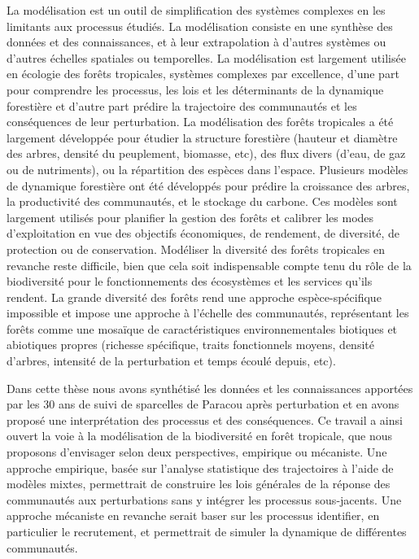 \documentclass[
  11pt,
  french,
  A4paper,
  extrafontsizes,onecolumn,openright
  ]{memoir}
\begin{document}
La modélisation est un outil de simplification des systèmes complexes en
les limitants aux processus étudiés. La modélisation consiste en une
synthèse des données et des connaissances, et à leur extrapolation à
d'autres systèmes ou d'autres échelles spatiales ou temporelles. La
modélisation est largement utilisée en écologie des forêts tropicales,
systèmes complexes par excellence, d'une part pour comprendre les
processus, les lois et les déterminants de la dynamique forestière et
d'autre part prédire la trajectoire des communautés et les conséquences
de leur perturbation. La modélisation des forêts tropicales a été
largement développée pour étudier la structure forestière (hauteur et
diamètre des arbres, densité du peuplement, biomasse, etc), des flux
divers (d'eau, de gaz ou de nutriments), ou la répartition des espèces
dans l'espace. Plusieurs modèles de dynamique forestière ont été
développés pour prédire la croissance des arbres, la productivité des
communautés, et le stockage du carbone. Ces modèles sont largement
utilisés pour planifier la gestion des forêts et calibrer les modes
d'exploitation en vue des objectifs économiques, de rendement, de
diversité, de protection ou de conservation. Modéliser la diversité des
forêts tropicales en revanche reste difficile, bien que cela soit
indispensable compte tenu du rôle de la biodiversité pour le
fonctionnements des écosystèmes et les services qu'ils rendent. La
grande diversité des forêts rend une approche espèce-spécifique
impossible et impose une approche à l'échelle des communautés,
représentant les forêts comme une mosaïque de caractéristiques
environnementales biotiques et abiotiques propres (richesse spécifique,
traits fonctionnels moyens, densité d'arbres, intensité de la
perturbation et temps écoulé depuis, etc).

Dans cette thèse nous avons synthétisé les données et les connaissances
apportées par les 30 ans de suivi de sparcelles de Paracou après
perturbation et en avons proposé une interprétation des processus et des
conséquences. Ce travail a ainsi ouvert la voie à la modélisation de la
biodiversité en forêt tropicale, que nous proposons d'envisager selon
deux perspectives, empirique ou mécaniste. Une approche empirique, basée
sur l'analyse statistique des trajectoires à l'aide de modèles mixtes,
permettrait de construire les lois générales de la réponse des
communautés aux perturbations sans y intégrer les processus
sous-jacents. Une approche mécaniste en revanche serait baser sur les
processus identifier, en particulier le recrutement, et permettrait de
simuler la dynamique de différentes communautés.
\end{document}
